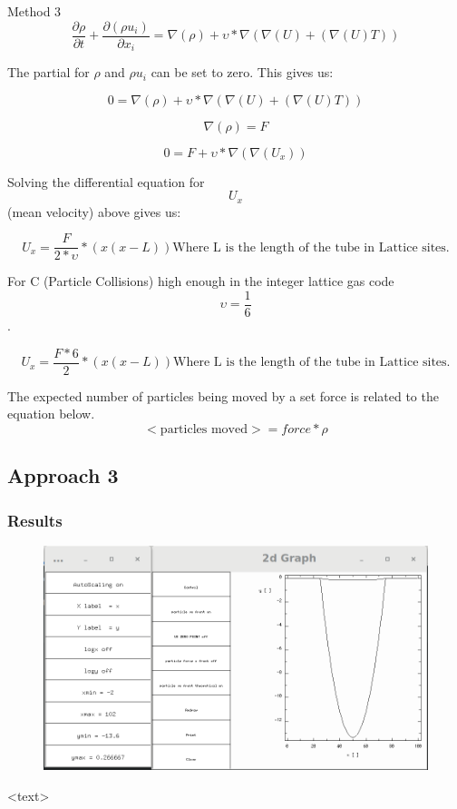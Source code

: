 \documentclass{beamer}
\begin{document}
\begin{frame}{Method 3}
\begin{equation}
\frac{\partial \rho}{\partial t} + \frac{\partial(\rho u_{i})}{\partial x_{i}} = \nabla(\rho) + \upsilon *\nabla(\nabla(U)+(\nabla(U)T))
\end{equation}

The partial for $\rho$ and $\rho u_{i}$ can be set to zero.
This gives us:

\begin{equation}
0 = \nabla(\rho) + \upsilon *\nabla(\nabla(U)+(\nabla(U)T))
\end{equation}


$$ \nabla(\rho) = F$$ 

\begin{equation}
0 = F + \upsilon *\nabla(\nabla(U_x))
\end{equation}

Solving the differential equation for $$U_x$$ (mean velocity) above gives us:

\begin{equation}
U_x =\frac{F}{2*\upsilon}*(x(x-L)) \textrm{Where L is the length of the tube in Lattice sites.}
\end{equation}

For C (Particle Collisions) high enough in the integer lattice gas code $$\upsilon = \frac{1}{6}$$.

\begin{equation}
U_x =\frac{F*6}{2}*(x(x-L)) \textrm{Where L is the length of the tube in Lattice sites.}
\end{equation}

The expected number of particles being moved by a set force is related to the equation below.  
\begin{equation}
<\textrm{particles moved}> = force*\rho
\end{equation}
\end{frame}


\subsection{Approach 3}

\begin{frame}
\frametitle{Results}
\begin{figure}
\includegraphics[scale=0.2]{A3p0}
\caption{}
\end{figure}
<text>
\end{frame}
\end{document}
